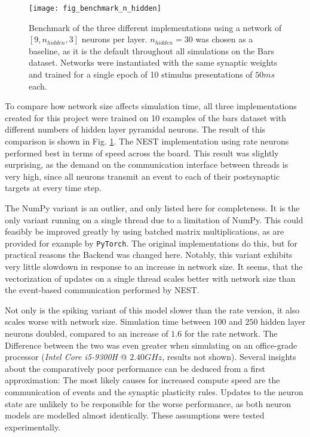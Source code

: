 \begin{figure}[h]
    \centering
    \texttt{[image: fig\_benchmark\_n\_hidden]}
    \caption{Benchmark of the three different implementations using a network of $[9, n_{hidden}, 3]$ neurons per layer.
        $n_{hidden}=30$ was chosen as a baseline, as it is the default throughout all simulations on the Bars dataset.
        Networks were instantiated with the same synaptic weights and trained for a single epoch of 10 stimulus
        presentations of $50ms$ each.}
    \label{fig-benchmark-n-hidden}
\end{figure}


To compare how network size affects simulation time, all three implementations created for this project were trained on
10 examples of the bars dataset with different numbers of hidden layer pyramidal neurons. The result of this comparison
is shown in Fig. \ref{fig-benchmark-n-hidden}.  The NEST implementation using rate neurons performed best in terms of
speed across the board. This result was slightly surprising, as the demand on the communication interface between
threads is very high, since all neurons transmit an event to each of their postsynaptic targets at every time step.

The NumPy variant is an outlier, and only listed here for completeness. It is the only variant running on a single
thread due to a limitation of NumPy. This could feasibly be improved greatly by using batched matrix multiplications, as
are provided for example by \texttt{PyTorch}. The original implementations do this, but for practical reasons the
Backend was changed here. Notably, this variant exhibits very little slowdown in response to an increase in network
size. It seems, that the vectorization of updates on a single thread scales better with network size than the
event-based communication performed by NEST.

Not only is the spiking variant of this model slower than the rate version, it also scales worse with network size.
Simulation time between $100$ and $250$ hidden layer neurons doubled, compared to an increase of $1.6$ for the rate
network. The Difference between the two was even greater when simulating on an office-grade processor (\textit{Intel
Core i5-9300H} @ $2.40GHz$, results not shown). Several insights about the comparatively poor performance can be deduced
from a first approximation: The most likely causes for increased compute speed are the communication of events and the
synaptic plasticity rules. Updates to the neuron state are unlikely to be responsible for the worse performance, as both
neuron models are modelled almost identically. These assumptions were tested experimentally.



